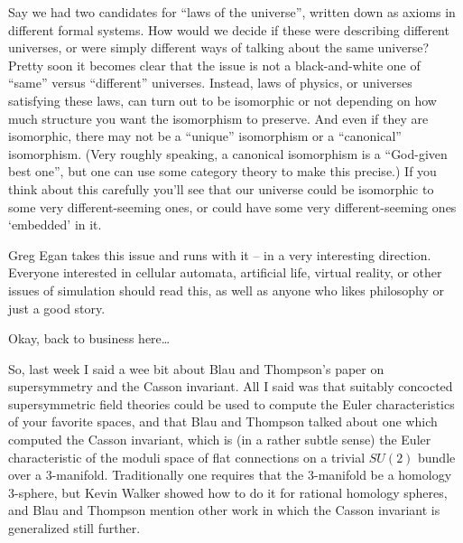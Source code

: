 \documentclass{article}
\renewcommand{\texttt}[1]{%
  \begingroup
  \ttfamily
  \begingroup\lccode`~=`/\lowercase{\endgroup\def~}{/\discretionary{}{}{}}%
  \begingroup\lccode`~=`[\lowercase{\endgroup\def~}{[\discretionary{}{}{}}%
  \begingroup\lccode`~=`.\lowercase{\endgroup\def~}{.\discretionary{}{}{}}%
  \catcode`/=\active\catcode`[=\active\catcode`.=\active
  \scantokens{#1\noexpand}%
  \endgroup
}
\begin{document}
Say we had two candidates for ``laws of the universe'', written down as
axioms in different formal systems. How would we decide if these were
describing different universes, or were simply different ways of talking
about the same universe? Pretty soon it becomes clear that the issue is
not a black-and-white one of ``same'' versus ``different'' universes.
Instead, laws of physics, or universes satisfying these laws, can turn
out to be isomorphic or not depending on how much structure you want the
isomorphism to preserve. And even if they are isomorphic, there may not
be a ``unique'' isomorphism or a ``canonical'' isomorphism. (Very
roughly speaking, a canonical isomorphism is a ``God-given best one'',
but one can use some category theory to make this precise.) If you think
about this carefully you'll see that our universe could be isomorphic to
some very different-seeming ones, or could have some very
different-seeming ones `embedded' in it.

Greg Egan takes this issue and runs with it -- in a very interesting
direction. Everyone interested in cellular automata, artificial life,
virtual reality, or other issues of simulation should read this, as well
as anyone who likes philosophy or just a good story.

Okay, back to business here\ldots{}


So, last week I said a wee bit about Blau and Thompson's paper on
supersymmetry and the Casson invariant. All I said was that suitably
concocted supersymmetric field theories could be used to compute the
Euler characteristics of your favorite spaces, and that Blau and
Thompson talked about one which computed the Casson invariant, which is
(in a rather subtle sense) the Euler characteristic of the moduli space
of flat connections on a trivial \(SU(2)\) bundle over a 3-manifold.
Traditionally one requires that the 3-manifold be a homology 3-sphere,
but Kevin Walker showed how to do it for rational homology spheres, and
Blau and Thompson mention other work in which the Casson invariant is
generalized still further.
\end{document}
